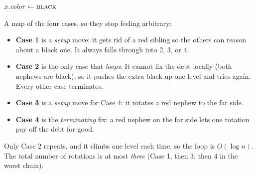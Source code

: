 \begin{algorithm}[H]
\caption{\textsc{RB-Delete-Fixup}$(T, x)$}
$x.\mathit{color} \gets \textsc{black}$\;
\end{algorithm}

\begin{focusbox}
A map of the four cases, so they stop feeling arbitrary:
\begin{itemize}
\item \textbf{Case 1} is a \emph{setup} move: it gets rid of a red sibling so the
others can reason about a black one. It always falls through into 2, 3, or 4.
\item \textbf{Case 2} is the only case that \emph{loops}. It cannot fix the debt
locally (both nephews are black), so it pushes the extra black up one level and
tries again. Every other case terminates.
\item \textbf{Case 3} is a \emph{setup} move for Case 4: it rotates a red nephew
to the far side.
\item \textbf{Case 4} is the \emph{terminating} fix: a red nephew on the far side
lets one rotation pay off the debt for good.
\end{itemize}
Only Case 2 repeats, and it climbs one level each time, so the loop is
$O(\log n)$. The total number of rotations is at most \emph{three} (Case 1, then
3, then 4 in the worst chain).
\end{focusbox}


